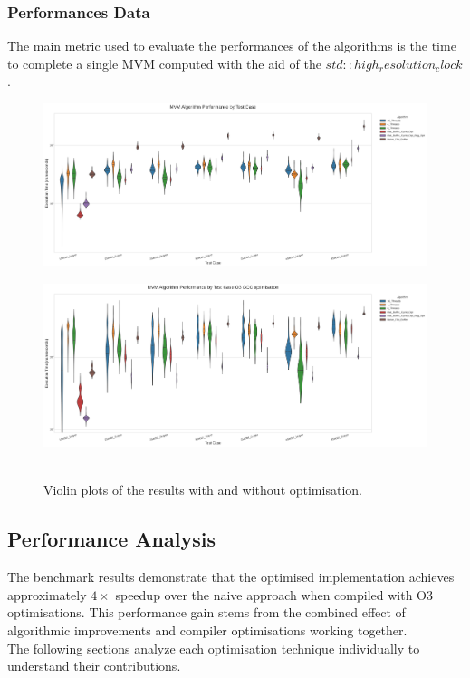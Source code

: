 \subsubsection{Performances Data}\label{sec:Data_Perf}
The main metric used to evaluate the performances of the algorithms is the time to complete a single MVM computed with the aid of the $std::high_resolution_clock$.
\begin{figure}[!htb]
\begin{minipage}{1\textwidth}
    {\includegraphics[width=\textwidth]{Figures/mvm_benchmark_violin_plot (1).png}
    \label{fig:no_opt_plot}}
\end{minipage}
\hfill
\begin{minipage}{1\textwidth}
    {\includegraphics[width=\textwidth]{Figures/mvm_benchmark_violin_plot_opt.png}
    \label{fig:opt_plot}}
\end{minipage}
\caption{\\ Violin plots of the results with and without optimisation. \label{fig:plots}}
\end{figure}




\subsection{Performance Analysis}\label{sec:data_anal}
The benchmark results demonstrate that the optimised implementation achieves approximately $4\times$ speedup over the naive approach when compiled with O3 optimisations. 
This performance gain stems from the combined effect of algorithmic improvements and compiler optimisations working together. \\
The following sections analyze each optimisation technique individually to understand their contributions.

